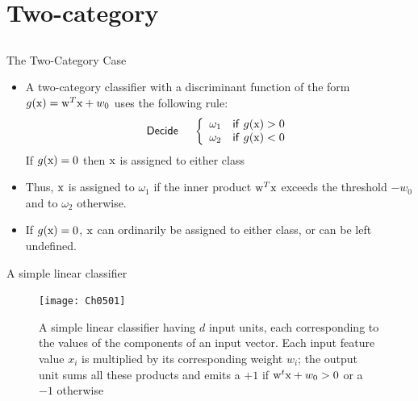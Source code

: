 \section{Two-category}
\subsection{}
\begin{frame}{The Two-Category Case}
\begin{itemize}
\setlength{\itemsep}{12pt}
\item A two-category classifier with a discriminant function of the form $g({\rm x})={\rm w}^T{\rm x}+w_0$ uses the following rule:\\
\begin{equation}
{\sf Decide}~~~~\left\{ {\begin{array}{*{20}{c}}
{{\omega_1}}&{{\sf if}~g({\rm x}) > 0}\\
{{\omega_2}}&{\sf if}~{ g({\rm x}) < 0}
\end{array}} \right.\nonumber
\end{equation}
If $g({\rm x}) = 0$ then ${\rm x}$ is assigned to either class
\item Thus, ${\rm x}$ is assigned to $\omega_1$ if the inner product ${\rm w}^T{\rm x}$ exceeds the
threshold $-w_0$ and to $\omega_2$ otherwise.
\item If $g({\rm x})=0$, ${\rm x}$ can ordinarily be assigned to either class, or can be left undefined.
\end{itemize}
\end{frame}

\begin{frame}{A simple linear classifier}
\begin{figure}
\texttt{[image: Ch0501]}
\caption{A simple linear classifier having $d$ input units, each corresponding to the values of the components of an input vector. Each input feature value $x_i$ is multiplied by its corresponding weight $w_i$; the output unit sums all these products and emits a $+1$ if ${\rm w}^t{\rm x}+w_0>0$ or a $-1$ otherwise}
\end{figure}
\end{frame}

